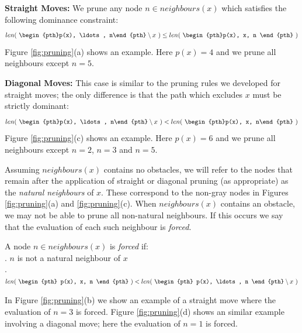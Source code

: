 \par \noindent
\textbf{Straight Moves:} We prune any node $n \in neighbours(x)$ which 
satisfies the following dominance constraint:
\begin{equation}
len(~\begin{pth}p(x), \ldots, n\end{pth} \setminus x~)
\leq len(~\begin{pth}p(x), x, n \end{pth}~)
\end{equation}
Figure \ref{fig:pruning}(a) shows an example. Here $p(x) = 4$ and we prune
 all neighbours except $n = 5$.
\par \noindent
\textbf{Diagonal Moves:} This case is similar to the pruning rules we developed
for straight moves; the only difference is that the path which excludes $x$ must 
be strictly dominant: 
\begin{equation}
len(~\begin{pth}p(x), \ldots, n\end{pth} \setminus x~) < len(~\begin{pth}p(x), x, n\end{pth}~)
\end{equation}
Figure \ref{fig:pruning}(c) shows an example. Here $p(x) = 6$ and we prune all
neighbours except $n = 2$, $n = 3$ and $n = 5$.  
\par
Assuming $neighbours(x)$ contains no obstacles, we will refer to the nodes
that remain after the application of straight or diagonal pruning (as
appropriate) as the \emph{natural neighbours} of $x$. These correspond to the non-gray
nodes in Figures \ref{fig:pruning}(a) and \ref{fig:pruning}(c).
When $neighbours(x)$ contains an obstacle, we may not be able to prune
all non-natural neighbours. If this occurs we say that the evaluation of each
such neighbour is \emph{forced}.

\begin{definition}
\label{def:forced}
A node $n \in neighbours(x)$ is \emph{forced} if: \\
. $n$ is not a natural neighbour of $x$\\
. $ len(~\begin{pth} p(x), x, n \end{pth}~) < len(~ \begin{pth} p(x), \ldots, n \end{pth} \setminus x~)$
\end{definition}
\par \noindent
In Figure \ref{fig:pruning}(b) we show an example of a straight move where 
the evaluation of $n = 3$ is forced. Figure \ref{fig:pruning}(d)  
shows an similar example involving a diagonal move; here the evaluation of
$n = 1$ is forced.
